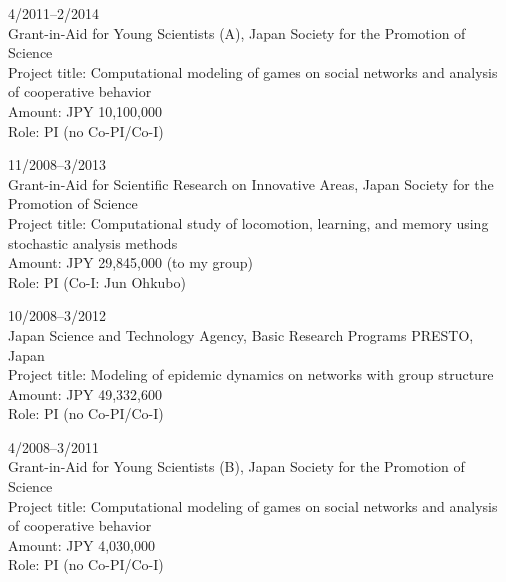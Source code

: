 \documentclass[11pt,letter]{article}
\renewenvironment{itemize}{
  \begin{list}{}{
    \setlength{\leftmargin}{1.5em}
    \setlength{\itemsep}{0.25em}
    \setlength{\parskip}{0pt}
    \setlength{\parsep}{0.25em}
  }
}{
  \end{list}
}
\begin{document}
\begin{itemize}
\item
4/2011--2/2014\\
Grant-in-Aid for Young Scientists (A), Japan Society for the Promotion of Science\\
Project title: Computational modeling of games on social networks and analysis of
cooperative behavior\\
Amount: JPY 10,100,000\\
Role: PI (no Co-PI/Co-I)

\item
11/2008--3/2013\\
Grant-in-Aid for Scientific Research on Innovative Areas, Japan Society for the Promotion of Science\\
Project title: Computational study of locomotion, learning, and memory using stochastic analysis methods\\
Amount: JPY 29,845,000 (to my group)\\
Role: PI (Co-I: Jun Ohkubo)
%

\item
10/2008--3/2012\\
Japan Science and Technology Agency, Basic Research Programs PRESTO, Japan\\
Project title: Modeling of epidemic dynamics on networks with group structure\\
Amount: JPY 49,332,600\\
Role: PI (no Co-PI/Co-I)

\item
4/2008--3/2011\\
Grant-in-Aid for Young Scientists (B), Japan Society for the Promotion of Science\\
Project title: Computational modeling of games on social networks and analysis of
cooperative behavior\\
Amount: JPY 4,030,000\\
Role: PI (no Co-PI/Co-I)


\end{itemize}
\end{document}
